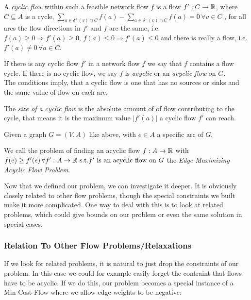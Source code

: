 \begin{definition}
A \textit{cyclic flow} within such a feasible network flow $f$ is a flow $f':C\to \mathbb{R}$, where $C\subseteq A$ is a cycle, 
$\sum_{a\in \delta^+(v)\cap C}f(a)-\sum_{a\in\delta^-(v)\cap C}f(a) = 0 \, \forall v\in C$ , for all arcs the flow 
directions in $f'$ and $f$ are the same, i.e. $f(a)\ge 0\Rightarrow f'(a)\ge 0,\, f(a)\le 0 \Rightarrow f'(a)\le 0$ and 
there is really a flow, i.e. $f'(a) \ne 0 \,\forall a\in C$. 

If there is any cyclic flow $f'$ in a network flow $f$ we say that $f$ contains a flow cycle. If there is no cyclic 
flow, we say $f$ is \textit{acyclic} or an \textit{acyclic flow} on $G$.\\

The conditions imply, that a cyclic flow is one that has no sources or sinks and the same value of flow on each arc.

The \textit{size of a cyclic flow} is the absolute amount of of flow contributing to the cycle, that means it is the 
maximum value $|f'(a)|$ a cyclic flow $f'$ can reach. 
\end{definition}


\begin{definition}
  Given a graph $G=(V,A)$ like above, with $e \in A$ a specific arc of $G$. 
  
  We call the problem of finding an acyclic flow $f:A\to \mathbb{R}$ with $f(e)\ge f'(e)\,\forall f':A\to \mathbb{R} \textrm{ s.t.} f' 
\textrm{ is an acyclic flow on }G$ the \textit{ Edge-Maximizing Acyclic Flow Problem}.
\end{definition}

Now that we defined our problem, we can investigate it deeper. It is obviously closely related to other flow problems, 
though the special constraints we built make it more complicated. One way to deal with this is to look at related 
problems, which could give bounds on our problem or even the same solution in special cases.

\subsubsection{Relation To Other Flow Problems/Relaxations}

If we look for related problems, it is natural to just drop the constraints of our problem. In this case we could for 
example easily forget the contraint that flows have to be acyclic. If we do this, our problem becomes a special 
instance of a Min-Cost-Flow where we allow edge weights to be negative:

